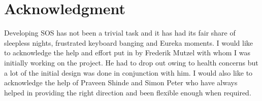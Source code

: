 \documentclass[a4paper, 11pt]{article}
\begin{document}
\section{Acknowledgment}
Developing SOS has not been a trivial task and it has had its fair
share of sleepless nights, frustrated keyboard banging and Eureka
moments. I would like to acknowledge the help and effort put in by
Frederik Mutzel with whom I was initially working on the project. He
had to drop out owing to health concerns but a lot of the initial
design was done in conjunction with him. I would also like to
acknowledge the help of Praveen Shinde and Simon Peter who have always
helped in providing the right direction and been flexible enough when required.
\newpage


\end{document}
